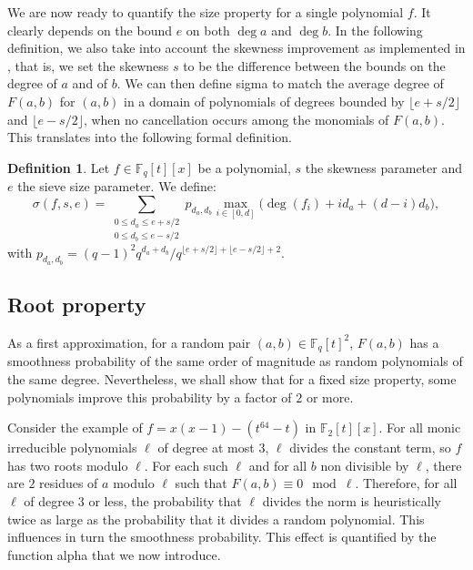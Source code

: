\documentclass[a4wide]{article}
\newcommand{\F}{{\mathbb F}}
\theoremstyle{plain}
\theoremstyle{definition}
\newtheorem{deff}[theo]{Definition}
\theoremstyle{remark}
\begin{document}

We are now ready to quantify the size property for a single polynomial
$f$. It clearly depends on the bound $e$ on both $\deg a$ and $\deg b$. 
In the following definition, we also take into account the skewness
improvement as implemented in \cite{DeGaVi12}, that is, we set the
skewness $s$ to be the difference between the bounds on the degree of $a$
and of $b$.  We can then define sigma to match the
average degree of $F(a,b)$ for $(a,b)$ in a domain of polynomials of degrees
bounded by $\lfloor e+s/2\rfloor$ and $\lfloor e-s/2\rfloor$, when no cancellation occurs among the
monomials of $F(a,b)$. This translates into the following formal
definition.

\begin{deff}  Let $f\in\F_q[t][x]$ be a polynomial, $s$ the skewness parameter 
	and $e$ the sieve size parameter. We define:
	\begin{equation}
		\sigma(f,s,e)=\sum_{\begin{array}{c}0\leq d_a\leq
			e+s/2\\0\leq d_b \leq
		e-s/2\end{array}}p_{d_a,d_b}\max_{i\in[0,d]}\bigg(\deg(f_i)+id_a+(d-i)d_b\bigg),
	\end{equation}
	with $p_{d_a,d_b}=(q-1)^2q^{d_a+d_b}/q^{\lfloor
e+s/2\rfloor+\lfloor e-s/2\rfloor+2}$.
\end{deff}
\subsection{Root property}

As a first approximation, for a random pair $(a,b)\in \F_q[t]^2$,
$F(a,b)$ has a smoothness probability of the same order of magnitude as
random polynomials of the same degree. Nevertheless, we shall show that for a
fixed size property, some polynomials improve this probability by a
factor of $2$ or more. 

Consider the example of
$f=x(x-1)-(t^{64}-t)$ in $\F_2[t][x]$. For all monic irreducible
polynomials $\ell$ of
degree at most $3$, $\ell$ divides the constant term, so $f$ has two roots
modulo $\ell$. For each such $\ell$ and for all $b$ non divisible by $\ell$,
there are $2$ residues of $a$ modulo $\ell$ such that $F(a,b)\equiv 0\mod
\ell$. Therefore, for all $\ell$ of degree $3$ or less, the probability
that $\ell$ divides the norm is heuristically twice as large as the
probability that it divides a random polynomial. This influences in turn the
smoothness probability. This effect is quantified by the function alpha
that we now introduce.
\end{document}
